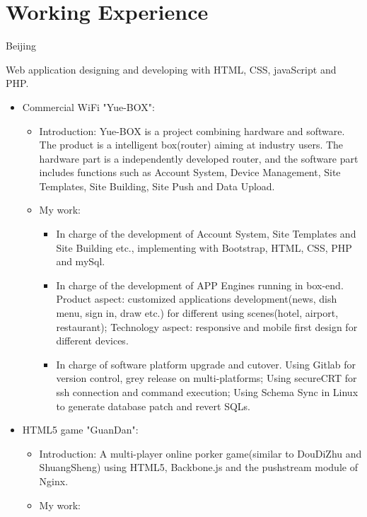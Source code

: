 \documentclass[11pt,a4paper,sans]{moderncv}        %
\begin{document}
\section{Working Experience}
 {Beijing}{}
{Web application designing and developing with HTML, CSS, javaScript and PHP.
\newline{}%
\begin{itemize}%
\item Commercial WiFi "Yue-BOX":
  \begin{itemize}%
  \item Introduction: Yue-BOX is a project combining hardware and software. The product is a intelligent box(router) aiming at industry users. The hardware part is a independently developed router, and the software part includes functions such as Account System, Device Management, Site Templates, Site Building, Site Push and Data Upload.
  \item My work:
      \begin{itemize}%
        \item In charge of the development of Account System, Site Templates and Site Building etc., implementing with Bootstrap, HTML, CSS, PHP and mySql.
        \item In charge of the development of APP Engines running in box-end. Product aspect: customized applications development(news, dish menu, sign in, draw etc.) for different using scenes(hotel, airport, restaurant); Technology aspect: responsive and mobile first design for different devices.
        \item In charge of software platform upgrade and cutover. Using Gitlab for version control, grey release on multi-platforms; Using secureCRT for ssh connection and command execution; Using Schema Sync in Linux to generate database patch and revert SQLs.
      \end{itemize}
  \end{itemize}
\item HTML5 game "GuanDan":
  \begin{itemize}%
  \item Introduction: A multi-player online porker game(similar to DouDiZhu and ShuangSheng) using HTML5, Backbone.js and the pushstream module of Nginx.
  \item My work:

\end{itemize}
\end{itemize}}
\end{document}
